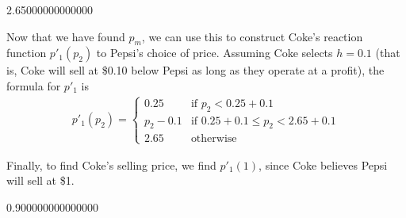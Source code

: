 \documentclass[letterpaper,10pt,english]{jupyterBook}
\begin{document}
\begin{sphinxVerbatim}[commandchars=\\\{\}]
2.65000000000000
\end{sphinxVerbatim}

\sphinxAtStartPar
Now that we have found \(p_m\), we can use this to construct Coke’s reaction function \(p'_1(p_2)\) to Pepsi’s choice of price. Assuming Coke selects \(h=0.1\) (that is, Coke will sell at \$0.10 below Pepsi as long as they operate at a profit), the formula for \(p'_1\) is
\begin{equation*}
\begin{split}
p'_1(p_2) = \begin{cases}
0.25 & \text{if } p_2 < 0.25 + 0.1 \\
p_2 - 0.1 & \text{if } 0.25 + 0.1 \le p_2 < 2.65 + 0.1 \\
2.65 & \text{otherwise}
\end{cases}
\end{split}
\end{equation*}
\noindent{}

\sphinxAtStartPar
Finally, to find Coke’s selling price, we find \(p'_1(1)\), since Coke believes Pepsi will sell at \$1.

\begin{sphinxVerbatim}[commandchars=\\\{\}]
  
  
  
  
         
           
     

 
\end{sphinxVerbatim}

\begin{sphinxVerbatim}[commandchars=\\\{\}]
0.900000000000000
\end{sphinxVerbatim}
\end{document}
